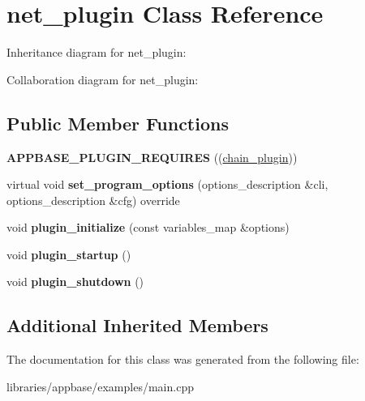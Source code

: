 \hypertarget{classnet__plugin}{}\section{net\+\_\+plugin Class Reference}
\label{classnet__plugin}


Inheritance diagram for net\+\_\+plugin\+:


Collaboration diagram for net\+\_\+plugin\+:
\subsection*{Public Member Functions}
\begin{DoxyCompactItemize}
\item 
\mbox{\label{classnet__plugin_a5b521845f266f661de90b7124f9899d2}} 
{\bfseries A\+P\+P\+B\+A\+S\+E\+\_\+\+P\+L\+U\+G\+I\+N\+\_\+\+R\+E\+Q\+U\+I\+R\+ES} ((\mbox{\hyperlink{classchain__plugin}{chain\+\_\+plugin}}))
\item 
\mbox{\label{classnet__plugin_aec9a119cdf9e78dda3108afb6a5d6c2e}} 
virtual void {\bfseries set\+\_\+program\+\_\+options} (options\+\_\+description \&cli, options\+\_\+description \&cfg) override
\item 
\mbox{\label{classnet__plugin_a35cbef8ad1bbd64e44d9a09672f5c206}} 
void {\bfseries plugin\+\_\+initialize} (const variables\+\_\+map \&options)
\item 
\mbox{\label{classnet__plugin_a2ac6db4551f2fbacf42b72d71f9bcbb2}} 
void {\bfseries plugin\+\_\+startup} ()
\item 
\mbox{\label{classnet__plugin_a9a4274f04d57a07434e3df9dd58359b4}} 
void {\bfseries plugin\+\_\+shutdown} ()
\end{DoxyCompactItemize}
\subsection*{Additional Inherited Members}


The documentation for this class was generated from the following file\+:\begin{DoxyCompactItemize}
\item 
libraries/appbase/examples/main.\+cpp\end{DoxyCompactItemize}
